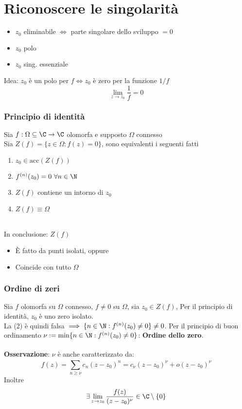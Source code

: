 
\section{Riconoscere le singolarità}
\begin{itemize}
	\item $z_0$ eliminabile $\iff$ parte singolare dello sviluppo $=0$
	\item $z_0$ polo 
	\item $z_0$ sing. essenziale 
\end{itemize}
Idea: $z_0$ è un polo per $f\iff z_0 $ è zero per la funzione $1/f$
\[\lim_{z \to z_0} \frac{1}{f}=0\]
\subsubsection{Principio di identità}
Sia $f:\Omega \subseteq  \C\to \C$ olomorfa e supposto $\Omega$ connesso
\\Sia $Z(f)=\{z\in\Omega : f(z)=0\} $, sono equivalenti i seguenti fatti
\begin{enumerate}
	
	\item $z_0\in \text{acc}(Z(f))$
	\item $f^{(n)}(z_0)=0\ \forall n\in\N$
	\item $Z(f)$ contiene un intorno di $z_0$
	\item $Z(f)\equiv\Omega$
\end{enumerate}
\\In conclusione: $Z(f)$
\begin{itemize}
	\item È fatto da punti isolati, oppure 
	\item Coincide con tutto $\Omega$ 
\end{itemize}
\subsubsection{Ordine di zeri}
Sia $f$ olomorfa su $\Omega$ connesso, $f\neq 0$ su $\Omega$, sia $z_0\in Z(f)$, Per il principio di identità, $z_0$ è uno zero isolato.
\\La (2) è quindi falsa $\implies \{n\in\N: f^{(n)}(z_0)\neq 0\} \neq 0$. Per il principio di buon ordinamento $\nu := \text{min}\{n\in\N: f^{(n)}(z_0)\neq 0\} $: \textbf{Ordine dello zero}.\\
\\\textbf{Osservazione}: $\nu$ è anche caratterizzato da:
\[f(z)=\sum_{n\ge \nu}^{} c_n(z-z_0)^n=c_\nu(z-z_0)^\nu+o(z-z_0)^\nu\]
Inoltre
\[\exists \lim_{z \to z_0} \frac{f(z)}{(z-z_0)^\nu}\in\C\setminus \{0\} \]
